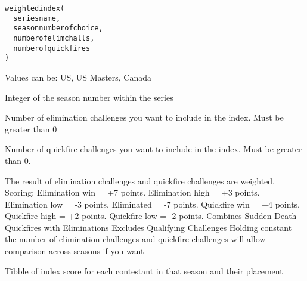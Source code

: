 \documentclass[a4paper]{book}
\begin{document}
%
\begin{Usage}
\begin{verbatim}
weightedindex(
  seriesname,
  seasonnumberofchoice,
  numberofelimchalls,
  numberofquickfires
)
\end{verbatim}
\end{Usage}
%
\begin{Arguments}
\begin{ldescription}
\item[\code{seriesname}] Values can be: US, US Masters, Canada

\item[\code{seasonnumberofchoice}] Integer of the season number within the series

\item[\code{numberofelimchalls}] Number of elimination challenges you want to
include in the index. Must be greater than 0

\item[\code{numberofquickfires}] Number of quickfire challenges you want to include
in the index. Must be greater than 0.
\end{ldescription}
\end{Arguments}
%
\begin{Details}
The result of elimination challenges and quickfire challenges are
weighted.
Scoring: Elimination win = +7 points. Elimination high = +3 points.
Elimination low = -3 points. Eliminated = -7 points.
Quickfire win = +4 points. Quickfire high = +2 points.
Quickfire low = -2 points.
Combines Sudden Death Quickfires with Eliminations
Excludes Qualifying Challenges
Holding constant the number of elimination challenges and quickfire
challenges will allow comparison across seasons if you want
\end{Details}
%
\begin{Value}
Tibble of index score for each contestant in that season and their
placement
\end{Value}
\printindex{}
\end{document}
